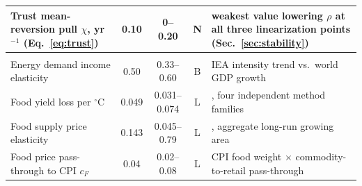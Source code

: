 \documentclass[12pt,a4paper]{article}
\newcommand{\degC}{$^{\circ}$C}
\begin{document}
\begin{xltabular}{\linewidth}{@{}>{\raggedright\arraybackslash}p{5.2cm}ccc L@{}}
Trust mean-reversion pull $\chi$, yr$^{-1}$ (Eq.~\ref{eq:trust}) & 0.10 & 0--0.20 & \textbf{N} & weakest value lowering $\rho$ at all three linearization points (Sec.~\ref{sec:stability}) \\
\midrule
{}\\
Energy demand income elasticity & 0.50 & 0.33--0.60 & B & IEA intensity trend vs.\ world GDP growth \\
Food yield loss per \degC & 0.049 & 0.031--0.074 & L & \citep{zhao2017}, four independent method families \\
Food supply price elasticity & 0.143 & 0.045--0.79 & L & \citep{haile2016}, aggregate long-run growing area \\
Food price pass-through to CPI $c_F$ & 0.04 & 0.02--0.08 & L & CPI food weight $\times$ commodity-to-retail pass-through \\
\end{xltabular}
\endgroup
\end{document}
